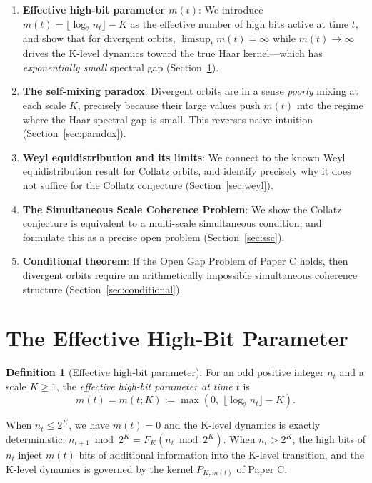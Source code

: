 \documentclass[12pt]{article}
\theoremstyle{definition}
\newtheorem{definition}[theorem]{Definition}
\begin{document}
\begin{enumerate}
\item \textbf{Effective high-bit parameter $m(t)$}: We introduce $m(t) = \lfloor\log_2 n_t\rfloor - K$ as the effective number of high bits active at time $t$, and show that for divergent orbits, $\limsup_t m(t) = \infty$ while $m(t) \to \infty$ drives the K-level dynamics toward the true Haar kernel---which has \emph{exponentially small} spectral gap (Section~\ref{sec:mt}).

\item \textbf{The self-mixing paradox}: Divergent orbits are in a sense \emph{poorly} mixing at each scale $K$, precisely because their large values push $m(t)$ into the regime where the Haar spectral gap is small. This reverses naive intuition (Section~\ref{sec:paradox}).

\item \textbf{Weyl equidistribution and its limits}: We connect to the known Weyl equidistribution result for Collatz orbits, and identify precisely why it does not suffice for the Collatz conjecture (Section~\ref{sec:weyl}).

\item \textbf{The Simultaneous Scale Coherence Problem}: We show the Collatz conjecture is equivalent to a multi-scale simultaneous condition, and formulate this as a precise open problem (Section~\ref{sec:ssc}).

\item \textbf{Conditional theorem}: If the Open Gap Problem of Paper C holds, then divergent orbits require an arithmetically impossible simultaneous coherence structure (Section~\ref{sec:conditional}).
\end{enumerate}

\section{The Effective High-Bit Parameter}
\label{sec:mt}

\begin{definition}[Effective high-bit parameter]
For an odd positive integer $n_t$ and a scale $K \geq 1$, the \emph{effective high-bit parameter at time $t$} is
\[
  m(t) = m(t; K) := \max\!\left(0,\; \lfloor \log_2 n_t \rfloor - K\right).
\]
\end{definition}

When $n_t \leq 2^K$, we have $m(t) = 0$ and the K-level dynamics is exactly deterministic: $n_{t+1} \bmod 2^K = F_K(n_t \bmod 2^K)$. When $n_t > 2^K$, the high bits of $n_t$ inject $m(t)$ bits of additional information into the K-level transition, and the K-level dynamics is governed by the kernel $P_{K,m(t)}$ of Paper C.
\end{document}
